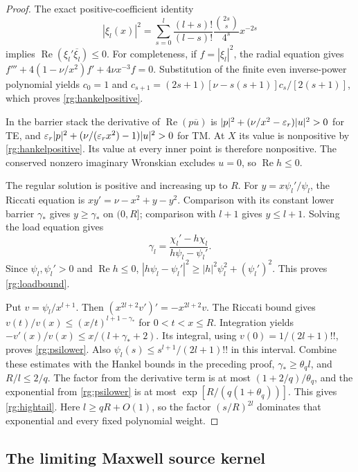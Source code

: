 \begin{proof}
The exact positive-coefficient identity
\begin{equation}\label{rg:hankelpositive}
 |\xi_l(x)|^2=
 \sum_{s=0}^l\frac{(l+s)!}{(l-s)!}
                \frac{\binom{2s}{s}}{4^s}x^{-2s}
\end{equation}
implies $\operatorname{Re}(\xi_l'\overline{\xi_l})\leq0$.
For completeness, if $f=|\xi_l|^2$, the radial equation gives
$f'''+4(1-\nu/x^2)f'+4\nu x^{-3}f=0$.
Substitution of the finite even inverse-power polynomial yields
$c_0=1$ and
$c_{s+1}=(2s+1)[\nu-s(s+1)]c_s/[2(s+1)]$,
which proves \eqref{rg:hankelpositive}.

In the barrier stack the derivative of
$\operatorname{Re}(p\overline u)$ is
$|p|^2+(\nu/x^2-\varepsilon_r)|u|^2>0$ for TE, and
$\varepsilon_r|p|^2+(\nu/(\varepsilon_rx^2)-1)|u|^2>0$ for TM.
At $X$ its value is nonpositive by \eqref{rg:hankelpositive}.
Its value at every inner point is therefore nonpositive.
The conserved nonzero imaginary Wronskian excludes $u=0$,
so $\operatorname{Re}h\leq0$.

The regular solution is positive and increasing up to $R$.
For $y=x\psi_l'/\psi_l$, the Riccati equation is
$xy'=\nu-x^2+y-y^2$. Comparison with its constant lower
barrier $\gamma_*$ gives $y\geq\gamma_*$ on $(0,R]$;
comparison with $l+1$ gives $y\leq l+1$.
Solving the load equation gives
\[
 \gamma_l=\frac{\chi_l'-h\chi_l}{h\psi_l-\psi_l'}.
\]
Since $\psi_l,\psi_l'>0$ and $\operatorname{Re}h\leq0$,
$|h\psi_l-\psi_l'|^2\geq
 |h|^2\psi_l^2+(\psi_l')^2$.
This proves \eqref{rg:loadbound}.

Put $v=\psi_l/x^{l+1}$.
Then $(x^{2l+2}v')'=-x^{2l+2}v$.
The Riccati bound gives
$v(t)/v(x)\leq(x/t)^{l+1-\gamma_*}$ for $0<t<x\leq R$.
Integration yields $-v'(x)/v(x)\leq x/(l+\gamma_*+2)$.
Its integral, using $v(0)=1/(2l+1)!!$, proves
\eqref{rg:psilower}. Also
$\psi_l(s)\leq s^{l+1}/(2l+1)!!$ in this interval.
Combine these estimates with the Hankel bounds in the preceding
proof, $\gamma_*\geq\theta_ql$, and $R/l\leq2/q$.
The factor from the derivative term is at most
$(1+2/q)/\theta_q$, and the exponential from
\eqref{rg:psilower} is at most
$\exp[R/(q(1+\theta_q))]$. This gives
\eqref{rg:hightail}. Here $l\geq qR+O(1)$, so the factor
$(s/R)^{2l}$ dominates that exponential and every fixed
polynomial weight.
\end{proof}

\subsection{The limiting Maxwell source kernel}

